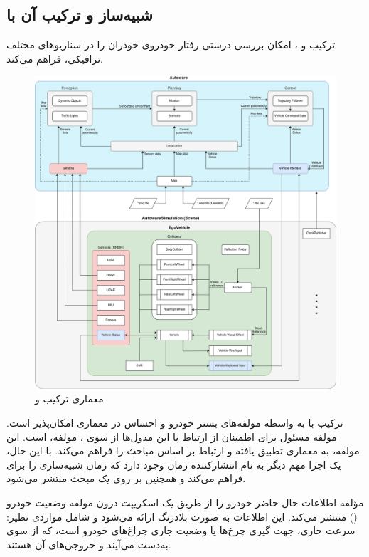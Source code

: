 \subsection{شبیه‌ساز  و ترکیب آن با }
ترکیب  و ، امکان بررسی درستی رفتار خودروی خودران را در سناریو‌های مختلف ترافیکی، فراهم می‌کند. 
\begin{figure}[h!]
    \centering
    \includegraphics[width=0.85\linewidth]{figures/AWSIM_Autoware_Architecture.png}
    \caption{معماری ترکیب  و  \cite{AWSIM:Documentation}}
    \label{fig:AWSIM_Autoware_Architecture}
\end{figure}
ترکیب  با  به واسطه مولفه‌های بستر خودرو و احساس در معماری  امکان‌پذیر است. مولفه مسئول برای اطمینان از ارتباط با این مدول‌ها از سوی ،  مولفه،  است. این مولفه، به معماری  تطبیق یافته‌ و ارتباط بر اساس مباحث  را فراهم می‌کند. با این حال، یک اجزا مهم دیگر به نام انتشار‌کننده زمان وجود دارد که زمان شبیه‌سازی را برای  فراهم می‌کند و همچنین بر روی یک مبحث  منتشر می‌شود.

مؤلفه  اطلاعات حال حاضر خودرو را از طریق یک اسکریپت درون مولفه وضعیت خودرو () منتشر می‌کند. این اطلاعات به صورت بلادرنگ ارائه می‌شود و شامل مواردی نظیر: سرعت جاری، جهت گیری چرخ‌ها یا وضعیت جاری چراغ‌های خودرو است، که از سوی  به‌دست می‌آیند و خروجی‌های آن هستند.

